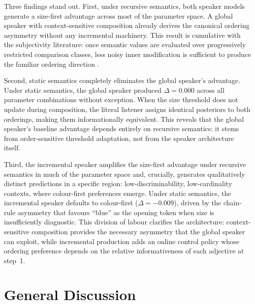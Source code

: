 \documentclass[man,floatsintext]{apa7}
\begin{document}
Three findings stand out.
First, under recursive semantics, both speaker models generate a size-first advantage across most of the parameter space.
A global speaker with context-sensitive composition already derives the canonical ordering asymmetry without any incremental machinery.
This result is cumulative with the subjectivity literature: once semantic values are evaluated over progressively restricted comparison classes, less noisy inner modification is sufficient to produce the familiar ordering direction \citep{franke2019subjectivity,scontras2019grammatical,scontras2020incremental}.

Second, static semantics completely eliminates the global speaker's advantage.
Under static semantics, the global speaker produced $\Delta = 0.000$ across all parameter combinations without exception.
When the size threshold does not update during composition, the literal listener assigns identical posteriors to both orderings, making them informationally equivalent.
This reveals that the global speaker's baseline advantage depends entirely on recursive semantics: it stems from order-sensitive threshold adaptation, not from the speaker architecture itself.

Third, the incremental speaker amplifies the size-first advantage under recursive semantics in much of the parameter space and, crucially, generates qualitatively distinct predictions in a specific region: low-discriminability, low-cardinality contexts, where colour-first preferences emerge.
Under static semantics, the incremental speaker defaults to colour-first ($\Delta = -0.009$), driven by the chain-rule asymmetry that favours ``blue'' as the opening token when size is insufficiently diagnostic.
This division of labour clarifies the architecture: context-sensitive composition provides the necessary asymmetry that the global speaker can exploit, while incremental production adds an online control policy whose ordering preference depends on the relative informativeness of each adjective at step~1.

\section{General Discussion}
\label{sec:discussion}
\end{document}
